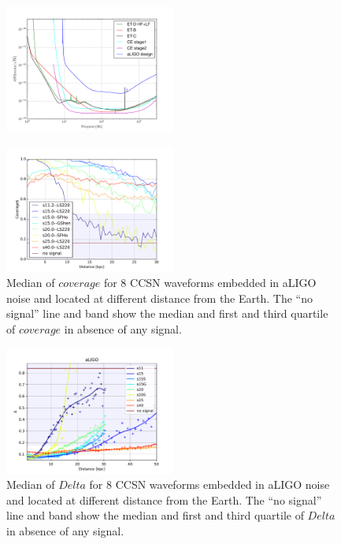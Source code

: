 \begin{figure}
 \centering
 \includegraphics[width=0.5\textwidth]{plots/spectrum}
 \caption{} \label{fig:spectrum}
\end{figure}

\begin{figure}
  \centering
  \includegraphics[width=0.5\textwidth]{plots/aLIGO_cov_allwvfs}
 \caption{Median of $coverage$ for 8 CCSN waveforms embedded in aLIGO noise and located at different distance from the Earth. The ``no signal'' line and band show the median and first and third quartile of $coverage$ in absence of any signal.} \label{fig:aLIGO_cov_allwvf}
\end{figure}

\begin{figure}
  \centering
  \includegraphics[width=0.5\textwidth]{plots/aLIGO_delta_allwvfs}
 \caption{Median of $Delta$ for 8 CCSN waveforms embedded in aLIGO noise and located at different distance from the Earth. The ``no signal'' line and band show the median and first and third quartile of $Delta$ in absence of any signal.} \label{fig:aLIGO_prec_allwvf}
\end{figure}



